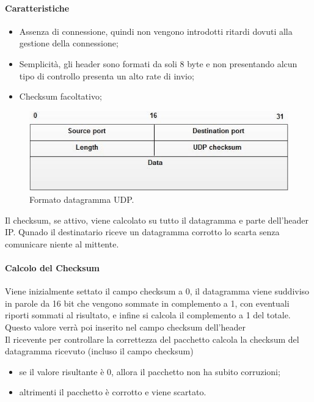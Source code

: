 \paragraph{Caratteristiche}
\begin{itemize}
    \item Assenza di connessione, quindi non vengono introdotti ritardi dovuti alla gestione della connessione;
    \item Semplicità, gli header sono formati da soli 8 byte e non presentando alcun tipo di controllo presenta un alto rate di invio;
    \item Checksum facoltativo;
\end{itemize}

\begin{figure}[h]
    \centering
    \includegraphics[scale=0.7]{Immagini/DatagramUDP.png}
    \caption{Formato datagramma UDP.}
\end{figure}

Il checksum, se attivo, viene calcolato su tutto il datagramma e parte dell'header IP.
Qunado il destinatario riceve un datagramma corrotto lo scarta senza comunicare niente al mittente.

\paragraph{Calcolo del Checksum}
Viene inizialmente settato il campo checksum a 0, il datagramma viene suddiviso in parole da 16 bit che vengono sommate in complemento a 1, con eventuali riporti sommati al risultato, e infine si calcola il complemento a 1 del totale.
Questo valore verrà poi inserito nel campo checksum dell'header
\\Il ricevente per controllare la correttezza del pacchetto calcola la checksum del datagramma ricevuto (incluso il campo checksum)
\begin{itemize}
    \item se il valore risultante è 0, allora il pacchetto non ha subito corruzioni;
    \item altrimenti il pacchetto è corrotto e viene scartato.
\end{itemize}

